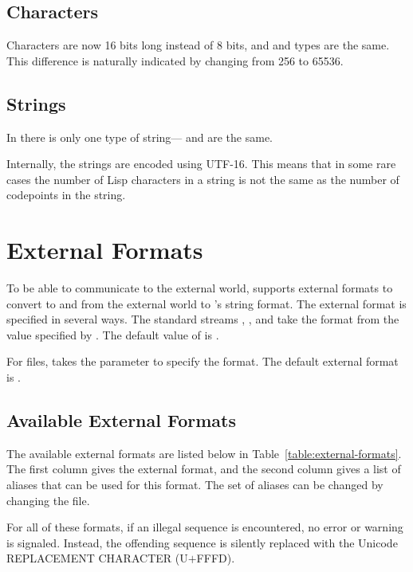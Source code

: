 \subsection{Characters}
\label{sec:i18n:characters}

Characters are now 16 bits long instead of 8 bits, and 
and  types are the same.  This difference is
naturally indicated by changing  from 256 to
65536.

\subsection{Strings}
\label{sec:i18n:strings}

In \cmucl{} there is only one type of string--- and
 are the same.  

Internally, the strings are encoded using UTF-16.  This means that in
some rare cases the number of Lisp characters in a string is not the
same as the number of codepoints in the string.


\section{External Formats}

To be able to communicate to the external world, \cmucl{} supports
external formats to convert to and from the external world to
\cmucl{}'s string format.  The external format is specified in several
ways.  The standard streams ,
, and  take the format
from the value specified by .  The
default value of  is .

For files,  takes the 
parameter to specify the format.  The default external format is
. 

\subsection{Available External Formats}

The available external formats are listed below in
Table~\ref{table:external-formats}.  The first column gives the
external format, and the second column gives a list of aliases that
can be used for this format.  The set of aliases can be changed by
changing the  file.

For all of these formats, if an illegal sequence is encountered, no
error or warning is signaled.  Instead, the offending sequence is
silently replaced with the Unicode REPLACEMENT CHARACTER (U$+$FFFD).

